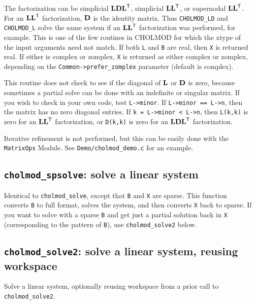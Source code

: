 \documentclass[11pt]{article}
\newcommand{\m}[1]{{\bf{#1}}}       %
\newcommand{\tr}{^{\sf T}}          %
\begin{document}
The factorization can be simplicial $\m{LDL}\tr$, simplicial $\m{LL}\tr$, or supernodal $\m{LL}\tr$.
For an $\m{LL}\tr$ factorization, $\m{D}$ is the identity matrix.  Thus {\tt CHOLMOD\_LD} and
{\tt CHOLMOD\_L} solve the same system if an $\m{LL}\tr$ factorization was performed,
for example.
This is one of the few routines in CHOLMOD for which the xtype of the input
arguments need not match.
If both {\tt L} and {\tt B} are real, then {\tt X} is returned real.  If either is complex
or zomplex, {\tt X} is returned as either complex or zomplex, depending on the
{\tt Common->prefer\_zomplex} parameter (default is complex).

This routine does not check to see if the diagonal of $\m{L}$ or $\m{D}$ is zero,
because sometimes a partial solve can be done with an indefinite or singular
matrix.  If you wish to check in your own code, test {\tt L->minor}.  If
{\tt L->minor == L->n}, then the matrix has no zero diagonal entries.
If {\tt k = L->minor < L->n}, then {\tt L(k,k)} is zero for an $\m{LL}\tr$ factorization, or
{\tt D(k,k)} is zero for an $\m{LDL}\tr$ factorization.

Iterative refinement is not performed, but this can be easily done with
the {\tt MatrixOps} Module.  See {\tt Demo/cholmod\_demo.c} for an example.

\subsection{{\tt cholmod\_spsolve}: solve a linear system}


Identical to {\tt cholmod\_solve}, except that {\tt B} and {\tt X} are sparse.
This function converts {\tt B} to full format, solves the system, and then
converts {\tt X} back to sparse.  If you want to solve with a sparse {\tt B}
and get just a partial solution back in {\tt X} (corresponding to the pattern
of {\tt B}), use {\tt cholmod\_solve2} below.

\subsection{{\tt cholmod\_solve2}: solve a linear system, reusing workspace}


Solve a linear system, optionally reusing workspace from a prior call
to {\tt cholmod\_solve2}.
\end{document}
